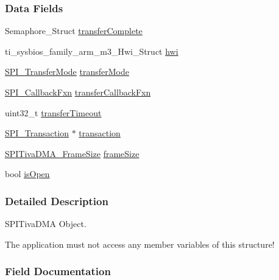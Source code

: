 \subsubsection*{Data Fields}
\begin{DoxyCompactItemize}
\item 
Semaphore\+\_\+\+Struct \hyperlink{struct_s_p_i_tiva_d_m_a___object_a063be770c053fb4643dfd09d4a10849e}{transfer\+Complete}
\item 
ti\+\_\+sysbios\+\_\+family\+\_\+arm\+\_\+m3\+\_\+\+Hwi\+\_\+\+Struct \hyperlink{struct_s_p_i_tiva_d_m_a___object_aabde395cde8a77c8a21152c70e9a4246}{hwi}
\item 
\hyperlink{_s_p_i_8h_ab9ea76c6529d6076eee5e1c4a5a92c6f}{S\+P\+I\+\_\+\+Transfer\+Mode} \hyperlink{struct_s_p_i_tiva_d_m_a___object_a6aaaff4b748edfe529783a1ad4fd0072}{transfer\+Mode}
\item 
\hyperlink{_s_p_i_8h_a207e2d5a7e7ea5606b6995b6485ca015}{S\+P\+I\+\_\+\+Callback\+Fxn} \hyperlink{struct_s_p_i_tiva_d_m_a___object_a61bd80a8b3c333deed8f62f7b111446a}{transfer\+Callback\+Fxn}
\item 
uint32\+\_\+t \hyperlink{struct_s_p_i_tiva_d_m_a___object_a295de290a40e3521f20e2c9dd83bfc16}{transfer\+Timeout}
\item 
\hyperlink{struct_s_p_i___transaction}{S\+P\+I\+\_\+\+Transaction} $\ast$ \hyperlink{struct_s_p_i_tiva_d_m_a___object_a6cdc7c21c1b929e2a2f3956072bd444f}{transaction}
\item 
\hyperlink{_s_p_i_tiva_d_m_a_8h_a65cb55b42cf383ece69876f50ba2d0a4}{S\+P\+I\+Tiva\+D\+M\+A\+\_\+\+Frame\+Size} \hyperlink{struct_s_p_i_tiva_d_m_a___object_a3f59d2d7fe94828380dda940e0ccdcdd}{frame\+Size}
\item 
bool \hyperlink{struct_s_p_i_tiva_d_m_a___object_a6df49861408f17545708084630dfca22}{is\+Open}
\end{DoxyCompactItemize}


\subsubsection{Detailed Description}
S\+P\+I\+Tiva\+D\+M\+A Object. 

The application must not access any member variables of this structure! 

\subsubsection{Field Documentation}
